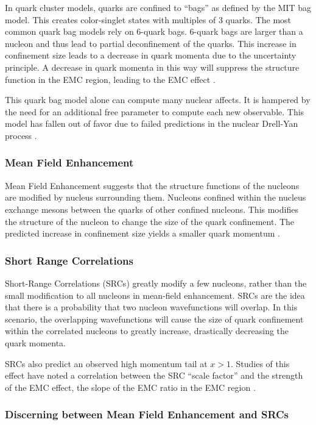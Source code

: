 In quark cluster models, quarks are confined to ``bags'' as defined by the MIT bag model. This creates color-singlet states with multiples of 3 quarks. The most common quark bag models rely on 6-quark bags. 6-quark bags are larger than a nucleon and thus lead to partial deconfinement of the quarks. This increase in confinement size leads to a decrease in quark momenta due to the uncertainty principle. A decrease in quark momenta in this way will suppress the structure function in the EMC region, leading to the EMC effect \cite{Norton,HenSRC}.

This quark bag model alone can compute many nuclear affects. It is hampered by the need for an additional free parameter to compute each new observable. This model has fallen out of favor due to failed predictions in the nuclear Drell-Yan process \cite{HenSRC}.

\subsubsection{Mean Field Enhancement}

Mean Field Enhancement suggests that the structure functions of the nucleons are modified by nucleus surrounding them. Nucleons confined within the nucleus exchange mesons between the quarks of other confined nucleons. This modifies the structure of the nucleon to change the size of the quark confinement. The predicted increase in confinement size yields a smaller quark momentum \cite{HenSRC,Daniel_thesis}.

\subsubsection{Short Range Correlations}

Short-Range Correlations (SRCs) greatly modify a few nucleons, rather than the small modification to all nucleons in mean-field enhancement. SRCs are the idea that there is a probability that two nucleon wavefunctions will overlap. In this scenario, the overlapping wavefunctions will cause the size of quark confinement within the correlated nucleons to greatly increase, drastically decreasing the quark momenta.

SRCs also predict an observed high momentum tail at $x>1$. Studies of this effect have noted a correlation between the SRC ``scale factor'' and the strength of the EMC effect, the slope of the EMC ratio in the EMC region \cite{HenSRC,CLASSRC,WeinsteinSRC}.

\subsubsection{Discerning between Mean Field Enhancement and SRCs}

